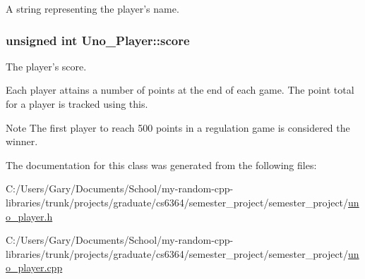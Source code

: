 \-A string representing the player's name. \hypertarget{class_uno___player_ad890e9b411f90bd5be34fffd9704f122}{
\subsubsection[{score}]{\setlength{\rightskip}{0pt plus 5cm}unsigned int {\bf \-Uno\-\_\-\-Player\-::score}}}
\label{class_uno___player_ad890e9b411f90bd5be34fffd9704f122}


\-The player's score. 

\-Each player attains a number of points at the end of each game. \-The point total for a player is tracked using this. \begin{DoxyNote}{\-Note}
\-The first player to reach 500 points in a regulation game is considered the winner. 
\end{DoxyNote}


\-The documentation for this class was generated from the following files\-:\begin{DoxyCompactItemize}
\item 
\-C\-:/\-Users/\-Gary/\-Documents/\-School/my-\/random-\/cpp-\/libraries/trunk/projects/graduate/cs6364/semester\-\_\-project/semester\-\_\-project/\hyperlink{uno__player_8h}{uno\-\_\-player.\-h}\item 
\-C\-:/\-Users/\-Gary/\-Documents/\-School/my-\/random-\/cpp-\/libraries/trunk/projects/graduate/cs6364/semester\-\_\-project/semester\-\_\-project/\hyperlink{uno__player_8cpp}{uno\-\_\-player.\-cpp}\end{DoxyCompactItemize}
